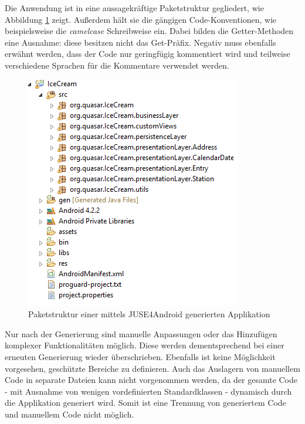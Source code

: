 \documentclass[a4paper,twoside]{article}
\begin{document}
Die Anwendung ist in eine aussagekräftige Paketstruktur gegliedert, wie Abbildung \ref{fig:Grafik4} zeigt. Außerdem hält sie die gängigen Code-Konventionen, wie beispielsweise die \textit{camelcase} Schreibweise ein. Dabei bilden die Getter-Methoden eine Ausnahme: diese besitzen nicht das Get-Präfix. Negativ muss ebenfalls erwähnt werden, dass der Code nur geringfügig kommentiert wird und teilweise verschiedene Sprachen für die Kommentare verwendet werden. %
\begin{figure}[!h]
	\centering
	\includegraphics[scale=.6]{pics/Paket.png}
	\caption{Paketstruktur einer mittels JUSE4Android generierten Applikation}
	\label{fig:Grafik4}
\end{figure}
Nur nach der Generierung sind manuelle Anpassungen oder das Hinzufügen komplexer Funktionalitäten möglich. Diese werden dementsprechend bei einer erneuten Generierung wieder überschrieben. Ebenfalls ist keine Möglichkeit vorgesehen, geschützte Bereiche zu definieren. Auch das Auslagern von manuellem Code in separate Dateien kann nicht vorgenommen werden, da der gesamte Code - mit Ausnahme von wenigen vordefinierten Standardklassen - dynamisch durch die Applikation generiert wird. Somit ist eine Trennung von generiertem Code und manuellem Code nicht möglich. 
\end{document}

